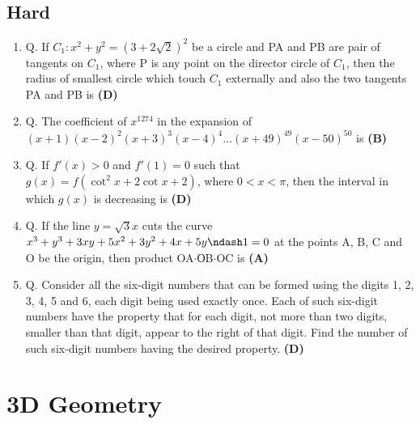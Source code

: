 \documentclass{article}
\begin{document}
\subsection{Hard}
\begin{enumerate}
\item Q. If $C_1 : x^2 + y^2 = (3+2\sqrt{2})^2$ be a circle and PA and PB are pair of tangents on $C_1$, where P is any point on the director circle of $C_1$, then the radius of smallest circle which touch $C_1$ externally and also the two tangents PA and PB is \hfill \textbf{(D)}
\item Q. The coefficient of $x^{1274}$ in the expansion of $(x+1)(x-2)^2(x+3)^3(x-4)^4 \dots (x+49)^{49}(x-50)^{50}$ is \hfill \textbf{(B)}
\item Q. If $f'(x) > 0$ and $f\prime(1) = 0$ such that $g(x) = f (\cot^2 x + 2 \cot x + 2)$, where $0 < x < \pi$, then the interval in which $g(x)$ is decreasing is \hfill \textbf{(D)}
\item Q. If the line $y = \sqrt{3}x$ cuts the curve $x^3 + y^3 + 3xy + 5x^2 + 3y^2 + 4x + 5y \ndash 1 = 0$ at the points A, B, C and O be the origin, then product OA$\cdot$ОB$\cdot$OC is \hfill \textbf{(A)}
\item Q. Consider all the six-digit numbers that can be formed using the digits 1, 2, 3, 4, 5 and 6, each digit being used exactly once. Each of such six-digit numbers have the property that for each digit, not more than two digits, smaller than that digit, appear to the right of that digit. Find the number of such six-digit numbers having the desired property. \hfill \textbf{(D)}
\end{enumerate}
\section{3D Geometry}
\end{document}
